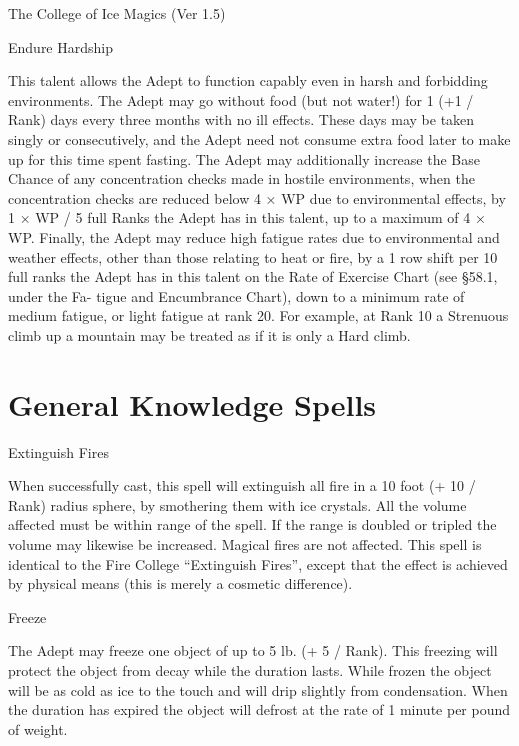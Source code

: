 \begin{Chapter}{The College of Ice Magics (Ver 1.5)}
\begin{talent}[T-2]{Endure Hardship}
\begin{effects}
This talent allows the Adept to function capably even in harsh and
forbidding environments.  The Adept may go without food (but not
water!) for 1 (+1 / Rank) days every three months with no ill
effects. These days may be taken singly or consecutively, and the
Adept need not consume extra food later to make up for this time spent
fasting.  The Adept may additionally increase the Base Chance of any
concentration checks made in hostile environments, when the
concentration checks are reduced below 4 × WP due to environmental
effects, by 1 × WP / 5 full Ranks the Adept has in this talent, up to
a maximum of 4 × WP.  Finally, the Adept may reduce high fatigue rates
due to environmental and weather effects, other than those relating to
heat or fire, by a 1 row shift per 10 full ranks the Adept has in this
talent on the Rate of Exercise Chart (see §58.1, under the Fa- tigue
and Encumbrance Chart), down to a minimum rate of medium fatigue, or
light fatigue at rank 20.  For example, at Rank 10 a Strenuous climb
up a mountain may be treated as if it is only a Hard climb.
\end{effects}
\end{talent}

\section{General Knowledge Spells}

\begin{spell}[G-1]{Extinguish Fires}

\begin{effects}
When successfully cast, this spell will extinguish all fire in a 10
foot (+ 10 / Rank) radius sphere, by smothering them with ice
crystals.  All the volume affected must be within range of the
spell. If the range is doubled or tripled the volume may likewise be
increased.  Magical fires are not affected.  This spell is identical
to the Fire College “Extinguish Fires”, except that the effect is
achieved by physical means (this is merely a cosmetic difference).
\end{effects}
\end{spell}

\begin{spell}[G-2]{Freeze}
\begin{effects}
The Adept may freeze one object of up to 5 lb.  (+ 5 / Rank).  This
freezing will protect the object from decay while the duration lasts.
While frozen the object will be as cold as ice to the touch and will
drip slightly from condensation. When the duration has expired the
object will defrost at the rate of 1 minute per pound of weight.
\end{effects}
\end{spell}


\end{Chapter}
